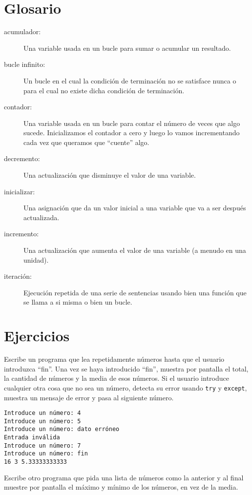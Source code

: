 \section{Glosario}

\begin{description}

\item[acumulador:] Una variable usada en un bucle para sumar o
acumular un resultado.

\item[bucle infinito:] Un bucle en el cual la condición de terminación no
se satisface nunca o para el cual no existe dicha condición de terminación.

\item[contador:] Una variable usada en un bucle para contar el número
de veces que algo sucede. Inicializamos el contador a
cero y luego lo vamos incrementando cada vez que queramos que
``cuente'' algo.

\item[decremento:] Una actualización que disminuye el valor de una variable.

\item[inicializar:] Una asignación que da un valor inicial a
una variable que va a ser después actualizada.

\item[incremento:] Una actualización que aumenta el valor de una variable
(a menudo en una unidad).

\item[iteración:] Ejecución repetida de una serie de sentencias usando
bien una función que se llama a si misma o bien un bucle.

\end{description}


\section{Ejercicios}

\begin{ex}
Escribe un programa que lea repetidamente números hasta que el usuario
introduzca ``fin''.
Una vez se haya introducido ``fin'', muestra por pantalla el total, la cantidad de números y la media
de esos números. Si el usuario introduce cualquier otra cosa que no sea un número,
detecta su error usando {\tt try} y {\tt except},
muestra un mensaje de error y pasa al siguiente número.

\begin{verbatim}
Introduce un número: 4
Introduce un número: 5
Introduce un número: dato erróneo
Entrada inválida
Introduce un número: 7
Introduce un número: fin
16 3 5.33333333333
\end{verbatim}
\end{ex}

\begin{ex}
Escribe otro programa que pida una lista de números como la anterior
y al final muestre por pantalla el máximo y mínimo de los números, en vez de la media.
\end{ex}


